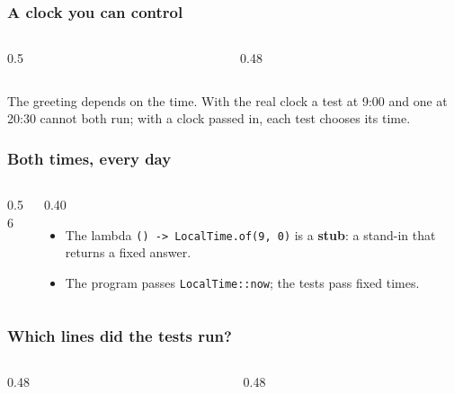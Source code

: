 \documentclass[aspectratio=169,10pt,compress]{beamer}
\begin{document}
\begin{frame}[t,fragile] \frametitle{A clock you can control}
  \begin{columns}[T]
    \begin{column}{0.5\textwidth}
    \end{column}
    \begin{column}{0.48\textwidth}
    \end{column}
  \end{columns}
  \small The greeting depends on the time. With the real clock a test at 9:00 and one at 20:30 cannot both run;
  with a clock passed in, each test chooses its time.
\end{frame}




\begin{frame}[t,fragile] \frametitle{Both times, every day}
  \begin{columns}[T]
    \begin{column}{0.56\textwidth}
    \end{column}
    \begin{column}{0.40\textwidth}
      \begin{itemize}\small
        \item The lambda \texttt{() -> LocalTime.of(9, 0)} is a \textbf{stub}: a stand-in that returns a fixed answer.
        \item The program passes \texttt{LocalTime::now}; the tests pass fixed times.
      \end{itemize}
    \end{column}
  \end{columns}
\end{frame}





\begin{frame}[t,fragile] \frametitle{Which lines did the tests run?}
  \begin{columns}[T]
    \begin{column}{0.48\textwidth}
    \end{column}
    \begin{column}{0.48\textwidth}
    \end{column}
  \end{columns}
\end{frame}
\end{document}

